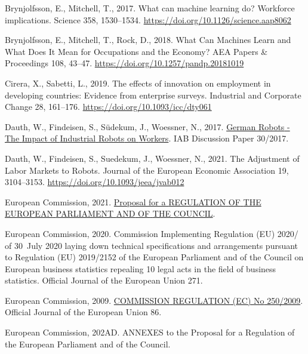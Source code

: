 \documentclass[
  11,
  a4paperpaper,
]{article}
\newlength{\cslhangindent}
\newenvironment{CSLReferences}[2] %
 {\begin{list}{}{%
  \setlength{\itemindent}{0pt}
  \setlength{\leftmargin}{0pt}
  \setlength{\parsep}{0pt}
  \ifodd #1
   \setlength{\leftmargin}{\cslhangindent}
   \setlength{\itemindent}{-1\cslhangindent}
  \fi
  \setlength{\itemsep}{#2\baselineskip}}}
 {\end{list}}
\begin{document}
\begin{CSLReferences}{1}{0}
Brynjolfsson, E., Mitchell, T., 2017. What can machine learning do?
{Workforce} implications. Science 358, 1530--1534.
\url{https://doi.org/10.1126/science.aap8062}

Brynjolfsson, E., Mitchell, T., Rock, D., 2018. What {Can} {Machines}
{Learn} and {What} {Does} {It} {Mean} for {Occupations} and the
{Economy}? AEA Papers \& Proceedings 108, 43--47.
\url{https://doi.org/10.1257/pandp.20181019}

Cirera, X., Sabetti, L., 2019. The effects of innovation on employment
in developing countries: Evidence from enterprise surveys. Industrial
and Corporate Change 28, 161--176.
\url{https://doi.org/10.1093/icc/dty061}

Dauth, W., Findeisen, S., Südekum, J., Woessner, N., 2017.
\href{https://ssrn.com/abstract=3039031}{German {Robots} - {The}
{Impact} of {Industrial} {Robots} on {Workers}}. IAB Discussion Paper
30/2017.

Dauth, W., Findeisen, S., Suedekum, J., Woessner, N., 2021. The
{Adjustment} of {Labor} {Markets} to {Robots}. Journal of the European
Economic Association 19, 3104--3153.
\url{https://doi.org/10.1093/jeea/jvab012}

European Commission, 2021.
\href{https://eur-lex.europa.eu/legal-content/EN/TXT/HTML/?uri=CELEX:52021PC0206}{Proposal
for a {REGULATION} {OF} {THE} {EUROPEAN} {PARLIAMENT} {AND} {OF} {THE}
{COUNCIL}}.

European Commission, 2020. Commission {Implementing} {Regulation} ({EU})
2020/ of 30~{July} 2020 laying down technical specifications and
arrangements pursuant to {Regulation} ({EU}) 2019/2152 of the {European}
{Parliament} and of the {Council} on {European} business statistics
repealing 10 legal acts in the field of business statistics. Official
Journal of the European Union 271.

European Commission, 2009.
\href{https://eur-lex.europa.eu/LexUriServ/LexUriServ.do?uri=OJ:L:2009:086:0001:0169:EN:PDF}{{COMMISSION}
{REGULATION} ({EC}) {No} 250/2009}. Official Journal of the European
Union 86.

European Commission, 202AD. {ANNEXES} to the {Proposal} for a
{Regulation} of the {European} {Parliament} and of the {Council}.


\end{CSLReferences}
\end{document}
